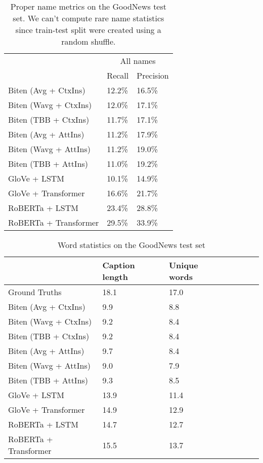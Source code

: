 \documentclass[10pt,twocolumn,letterpaper]{article}
\begin{document}
\begin{table*}[t]
   \caption {Proper name metrics on the GoodNews test set. We can't compute rare name statistics
   since train-test split were created using a random shuffle.}
	\label{tab:results-names}
	\centering
	\begin{tabular}{lll}
		\toprule
        & \multicolumn{2}{c}{All names}  \\
        & Recall  & Precision \\
      \midrule
      Biten (Avg + CtxIns) \cite{Biten2019GoodNews} & 12.2\% & 16.5\% \\
      Biten (Wavg + CtxIns) \cite{Biten2019GoodNews} & 12.0\% & 17.1\% \\
      Biten (TBB + CtxIns) \cite{Biten2019GoodNews} & 11.7\% & 17.1\% \\
      Biten (Avg + AttIns) \cite{Biten2019GoodNews} & 11.2\% & 17.9\% \\
      Biten (Wavg + AttIns) \cite{Biten2019GoodNews} & 11.2\% & 19.0\% \\
      Biten (TBB + AttIns) \cite{Biten2019GoodNews} & 11.0\% & 19.2\% \\
      \midrule
      GloVe + LSTM & 10.1\% & 14.9\%  \\
      GloVe + Transformer & 16.6\% & 21.7\% \\
      RoBERTa + LSTM & 23.4\% & 28.8\%  \\
      RoBERTa + Transformer & 29.5\% & 33.9\%  \\
		\bottomrule
	\end{tabular}
\end{table*}

\begin{table*}[t]
	\caption {Word statistics on the GoodNews test set}
	\label{tab:results-stats}
	\centering
	\begin{tabular}{lllllll}
		\toprule
        & Caption length  & Unique words \\
      \midrule
      Ground Truths & 18.1 & 17.0 \\
      \midrule
      Biten (Avg + CtxIns) \cite{Biten2019GoodNews}  & 9.9 & 8.8 \\
      Biten (Wavg + CtxIns) \cite{Biten2019GoodNews}  & 9.2 & 8.4 \\
      Biten (TBB + CtxIns) \cite{Biten2019GoodNews}  & 9.2 & 8.4 \\
      Biten (Avg + AttIns) \cite{Biten2019GoodNews}  & 9.7 & 8.4 \\
      Biten (Wavg + AttIns) \cite{Biten2019GoodNews}  & 9.0 & 7.9 \\
      Biten (TBB + AttIns) \cite{Biten2019GoodNews}  & 9.3 & 8.5 \\
      \midrule
      GloVe + LSTM & 13.9 & 11.4 \\
      GloVe + Transformer & 14.9 & 12.9 \\
      RoBERTa + LSTM & 14.7 & 12.7  \\
      RoBERTa + Transformer & 15.5 & 13.7 \\
		\bottomrule
	\end{tabular}
\end{table*}
\end{document}

